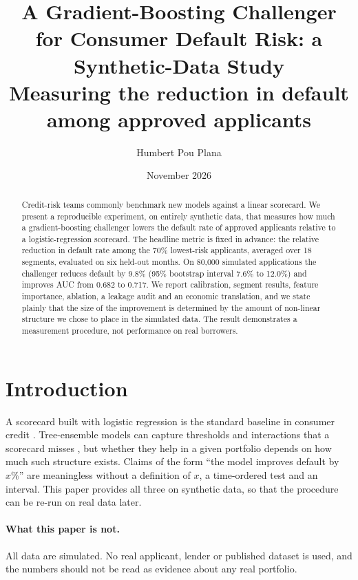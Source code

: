 \documentclass[10pt,a4paper]{article}
\begin{document}
\title{\bfseries A Gradient-Boosting Challenger for Consumer Default Risk: a Synthetic-Data Study\\[2pt]\large Measuring the reduction in default among approved applicants}
\author{Humbert Pou Plana}
\date{November 2026}
\maketitle
\begin{abstract}
Credit-risk teams commonly benchmark new models against a linear scorecard. We present a reproducible experiment, on entirely synthetic data, that measures how much a gradient-boosting challenger lowers the default rate of approved applicants relative to a logistic-regression scorecard. The headline metric is fixed in advance: the relative reduction in default rate among the 70\% lowest-risk applicants, averaged over 18 segments, evaluated on six held-out months. On 80{,}000 simulated applications the challenger reduces default by 9.8\% (95\% bootstrap interval 7.6\% to 12.0\%) and improves AUC from 0.682 to 0.717. We report calibration, segment results, feature importance, ablation, a leakage audit and an economic translation, and we state plainly that the size of the improvement is determined by the amount of non-linear structure we chose to place in the simulated data. The result demonstrates a measurement procedure, not performance on real borrowers.
\end{abstract}

\section{Introduction}
A scorecard built with logistic regression is the standard baseline in consumer credit \cite{siddiqi}. Tree-ensemble models can capture thresholds and interactions that a scorecard misses \cite{friedman,ke}, but whether they help in a given portfolio depends on how much such structure exists. Claims of the form ``the model improves default by $x\%$'' are meaningless without a definition of $x$, a time-ordered test and an interval. This paper provides all three on synthetic data, so that the procedure can be re-run on real data later.

\paragraph{What this paper is not.} All data are simulated. No real applicant, lender or published dataset is used, and the numbers should not be read as evidence about any real portfolio.
\end{document}
